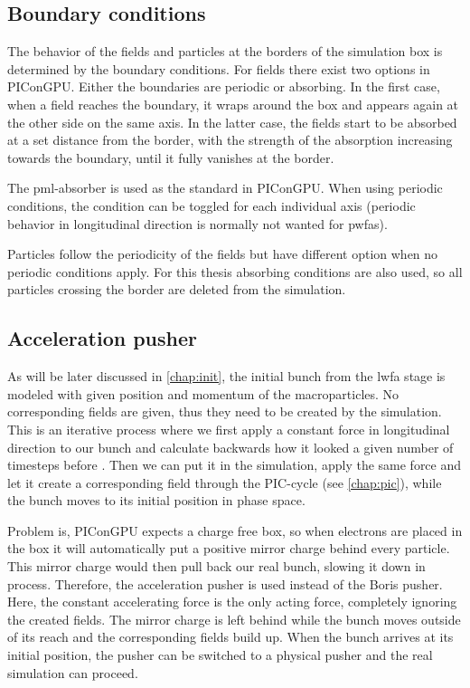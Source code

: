 \documentclass[bachelor_thesis]{subfiles}
\begin{document}
\subsection{Boundary conditions}
The behavior of the fields and particles at the borders of the simulation box is determined by the boundary conditions.
For fields there exist two options in PIConGPU. Either the boundaries are periodic or absorbing. In the first case, when a field reaches the boundary, it wraps around the box and appears again at the other side on the same axis.
In the latter case, the fields start to be absorbed at a set distance from the border, with the strength of the absorption increasing towards the boundary, until it fully vanishes at the border.

The \gls{pml}-absorber is used as the standard in PIConGPU. When using periodic conditions, the condition can be toggled for each individual axis (periodic behavior in longitudinal direction is normally not wanted for \gls{pwfa}s).

Particles follow the periodicity of the fields but have different option when no periodic conditions apply. For this thesis absorbing conditions are also used, so all particles crossing the border are deleted from the simulation.

\subsection{Acceleration pusher} \label{chap:accpush}
As will be later discussed in \autoref{chap:init}, the initial bunch from the \gls{lwfa} stage is modeled with given position and momentum of the macroparticles.
No corresponding fields are given, thus they need to be created by the simulation. This is an iterative process where we first apply a constant force in longitudinal direction to our bunch and calculate backwards how it looked a given number of timesteps before \cite{Huebl2014}.
Then we can put it in the simulation, apply the same force and let it create a corresponding field through the PIC-cycle (see \autoref{chap:pic}), while the bunch moves to its initial position in phase space.

Problem is, PIConGPU expects a charge free box, so when electrons are placed in the box it will automatically put a positive mirror charge behind every particle. This mirror charge would then pull back our real 
bunch, slowing it down in process. Therefore, the acceleration pusher is used instead of the Boris pusher. Here, the constant accelerating force is the only acting force, completely ignoring the created fields.
The mirror charge is left behind while the bunch moves outside of its reach and the corresponding fields build up. When the bunch arrives at its initial position, the pusher can be switched to a physical pusher and
the real simulation can proceed.
\end{document}
